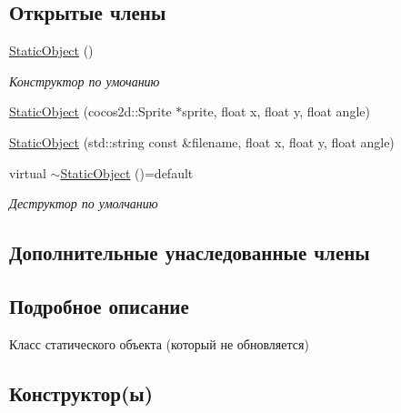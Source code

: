 \subsection*{Открытые члены}
\begin{DoxyCompactItemize}
\item 
\mbox{\label{classrtm_1_1_static_object_a28d0f4f8205c5ad132afca9ecfc9143e}} 
\hyperlink{classrtm_1_1_static_object_a28d0f4f8205c5ad132afca9ecfc9143e}{Static\+Object} ()
\begin{DoxyCompactList}\small\item\em Конструктор по умочанию \end{DoxyCompactList}\item 
\hyperlink{classrtm_1_1_static_object_a98a64488b482ca02b10c0f1fed4fcad0}{Static\+Object} (cocos2d\+::\+Sprite $\ast$sprite, float x, float y, float angle)
\item 
\hyperlink{classrtm_1_1_static_object_af17012380ecde141998deadea57acd79}{Static\+Object} (std\+::string const \&filename, float x, float y, float angle)
\item 
\mbox{\label{classrtm_1_1_static_object_ab7ae519ee89a02f8ce1178af045bdb7f}} 
virtual \hyperlink{classrtm_1_1_static_object_ab7ae519ee89a02f8ce1178af045bdb7f}{$\sim$\+Static\+Object} ()=default
\begin{DoxyCompactList}\small\item\em Деструктор по умолчанию \end{DoxyCompactList}\end{DoxyCompactItemize}
\subsection*{Дополнительные унаследованные члены}


\subsection{Подробное описание}
Класс статического объекта (который не обновляется) 

\subsection{Конструктор(ы)}
\mbox{\label{classrtm_1_1_static_object_a98a64488b482ca02b10c0f1fed4fcad0}} 
